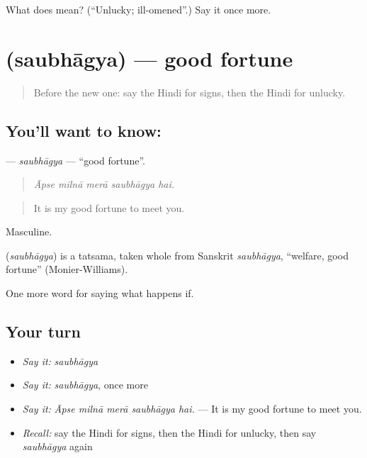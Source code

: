 \begin{tcolorbox}[breakable,colback=teal!4,colframe=teal!35!black,title={Before you move on}]
What does  mean? (\textquotedblleft{}Unlucky; ill-omened\textquotedblright{}.) Say it once more.
\end{tcolorbox}
\section[\texorpdfstring{\hi{सौभाग्य} (saubhāgya)}{सौभाग्य (saubhāgya)}]{ (saubhāgya) — good fortune}

\label{lesson:HI-C546-saubhagya}



\begin{quote}
Before the new one: say the Hindi for signs, then the Hindi for unlucky.
\end{quote}

\subsection*{You'll want to know: }
\textbf{} — \emph{saubhāgya} — \textquotedblleft{}good fortune\textquotedblright{}.

\begin{quote}
    
\end{quote}

\begin{quote}
\emph{Āpse milnā merā saubhāgya hai.}
\end{quote}

\begin{quote}
It is my good fortune to meet you.
\end{quote}

Masculine.

\begin{cousinweb}
\textbf{} (\emph{saubhāgya}) is a tatsama, taken whole from Sanskrit \emph{saubhāgya}, \textquotedblleft{}welfare, good fortune\textquotedblright{} (Monier-Williams).
\end{cousinweb}

\begin{grammarlens}[title={What you've built}]
One more word for saying what happens if.
\end{grammarlens}

\subsection*{Your turn}
\begin{itemize}
\raggedright
  \item \emph{Say it:} \emph{saubhāgya}
  \item \emph{Say it:} \emph{saubhāgya}, once more
  \item \emph{Say it:} \emph{Āpse milnā merā saubhāgya hai.} — It is my good fortune to meet you.
  \item \emph{Recall:} say the Hindi for signs, then the Hindi for unlucky, then say \emph{saubhāgya} again
\end{itemize}

